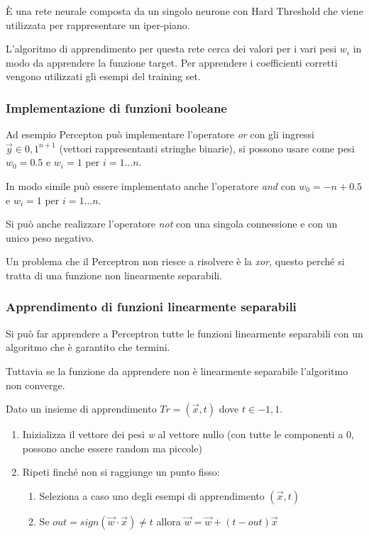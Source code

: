 È una rete neurale composta da un singolo neurone con Hard Threshold che
viene utilizzata per rappresentare un iper-piano.

L'algoritmo di apprendimento per questa rete cerca dei valori per i vari
pesi $w_i$ in modo da apprendere la funzione target. Per apprendere
i coefficienti corretti vengono utilizzati gli esempi del training set.

\subsubsection{Implementazione di funzioni booleane}\label{implementazione-di-funzioni-booleane}

Ad esempio Percepton può implementare l'operatore \emph{or} con gli
ingressi $\vec{y} \in {0,1}^{n+1}$ (vettori rappresentanti stringhe
binarie), si possono usare come pesi $w_0 = 0.5$ e $w_i = 1$
per $i = 1 \ldots n$.

In modo simile può essere implementato anche l'operatore \emph{and} con
$w_0 = -n+0.5$ e $w_i = 1$ per $i = 1 \ldots n$.

Si può anche realizzare l'operatore \emph{not} con una singola
connessione e con un unico peso negativo.

Un problema che il Perceptron non riesce a risolvere è la \emph{xor},
questo perché si tratta di una funzione non linearmente separabili.

\subsubsection{Apprendimento di funzioni linearmente separabili}\label{apprendimento-di-funzioni-linearmente-separabili}

Si può far apprendere a Perceptron tutte le funzioni linearmente
separabili con un algoritmo che è garantito che termini.

Tuttavia se la funzione da apprendere non è linearmente separabile
l'algoritmo non converge.

Dato un insieme di apprendimento $Tr = {(\vec{x},t)}$ dove $t \in {-1,1}$.

\begin{enumerate}
\item
  Inizializza il vettore dei pesi \emph{w} al vettore nullo (con tutte
  le componenti a 0, possono anche essere random ma piccole)
\item
  Ripeti finché non si raggiunge un punto fisso:

  \begin{enumerate}
  \item
    Seleziona a caso uno degli esempi di apprendimento $(\vec{x},t)$
  \item
    Se $out = sign(\vec{w} \cdot \vec{x}) \neq t$ allora $\vec{w} = \vec{w} + (t - out)\vec{x}$
  \end{enumerate}
\end{enumerate}

